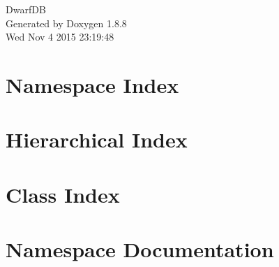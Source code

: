 \documentclass[twoside]{book}
\newcommand{\+}{\discretionary{\mbox{\scriptsize$\hookleftarrow$}}{}{}}
\newcommand{\clearemptydoublepage}{%
  \newpage{\pagestyle{empty}\cleardoublepage}%
}
\begin{document}
\hypersetup{pageanchor=false,
             bookmarks=true,
             bookmarksnumbered=true,
             pdfencoding=unicode
            }
\begin{titlepage}
\vspace*{7cm}
\begin{center}%
{\Large Dwarf\+D\+B }\\
\vspace*{1cm}
{\large Generated by Doxygen 1.8.8}\\
\vspace*{0.5cm}
{\small Wed Nov 4 2015 23:19:48}\\
\end{center}
\end{titlepage}
\clearemptydoublepage
\tableofcontents
\clearemptydoublepage
{}
\hypersetup{pageanchor=true}

\chapter{Namespace Index}

\chapter{Hierarchical Index}

\chapter{Class Index}

\chapter{Namespace Documentation}


















\end{document}
